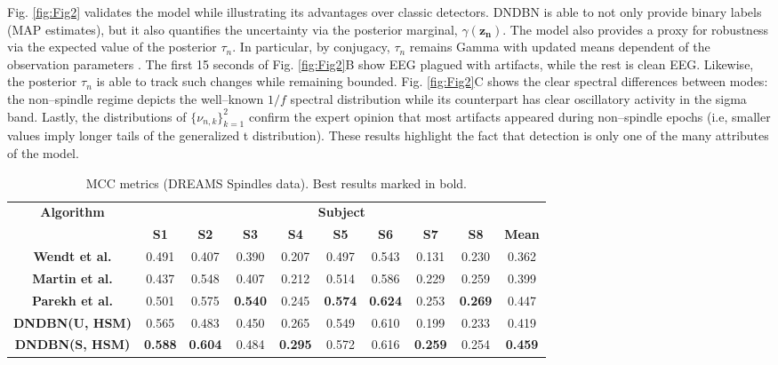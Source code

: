 \documentclass[runningheads]{llncs}
\begin{document}
Fig. \ref{fig:Fig2} validates the model while illustrating its advantages over classic detectors. DNDBN is able to not only provide binary labels (MAP estimates), but it also quantifies the uncertainty via the posterior marginal, $\gamma(\mathbf{z_{n}})$. The model also provides a proxy for robustness via the expected value of the posterior $\tau_n$. In particular, by conjugacy, $\tau_n$ remains Gamma with updated means dependent of the observation parameters \cite{peel2000robust}. The first 15 seconds of Fig.  \ref{fig:Fig2}B show EEG plagued with artifacts, while the rest is clean EEG. Likewise, the posterior $\tau_n$ is able to track such changes while remaining bounded. Fig. \ref{fig:Fig2}C  shows the clear spectral differences between modes: the non--spindle regime depicts the well--known $1/f$ spectral distribution \cite{freeman2012imaging} while its counterpart has clear oscillatory activity in the sigma band. Lastly, the distributions of  $\{\nu_{n,k}\}_{k=1}^2$ confirm the expert opinion that most artifacts appeared during non--spindle epochs (i.e, smaller values imply longer tails of the generalized t distribution). These  results highlight the fact that detection is only one of the many attributes of the model.
\begin{table*}[tb]
	\centering
	\caption{MCC metrics (DREAMS Spindles data). Best results marked in bold.}
	\label{table:Supervised}
	\begin{tabular}{|c||c|c|c|c|c|c|c|c||c|}
		\hline
		\textbf{Algorithm} & \multicolumn{9}{c|}{\textbf{Subject}} \\
		\cline{2-10}
		& \textbf{S1} & \textbf{S2} &  \textbf{S3} & \textbf{S4} & \textbf{S5} & \textbf{S6} & \textbf{S7} & \textbf{S8} & \textbf{Mean}\\
		\hline
		\textbf{Wendt et al.} & 0.491 & 0.407 & 0.390 & 0.207 & 0.497 & 0.543 & 0.131 & 0.230 & 0.362 \\
		\hline
		\textbf{Martin et al.} & 0.437 & 0.548 & 0.407 & 0.212 & 0.514 & 0.586 & 0.229 & 0.259 & 0.399 \\
		\hline
		\textbf{Parekh et al.} & 0.501 & 0.575 & \textbf{0.540} & 0.245 & \textbf{0.574} & \textbf{0.624} & 0.253 & \textbf{0.269} &  0.447\\
		\hline
		\textbf{DNDBN(U, HSM)} & 0.565 & 0.483 & 0.450 & 0.265 & 0.549 & 0.610 & 0.199 & 0.233 & 0.419 \\
		\hline
		\textbf{DNDBN(S, HSM)} & \textbf{0.588} & \textbf{0.604} & 0.484 & \textbf{0.295} & 0.572 & 0.616 & \textbf{0.259} & 0.254 & \textbf{0.459} \\
		\hline
	\end{tabular}
\end{table*}
\end{document}
